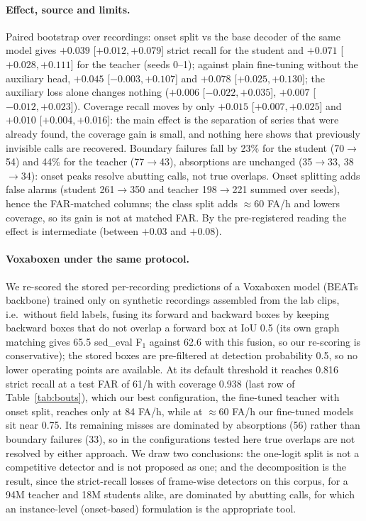 \documentclass[10pt,twocolumn]{article}
\newcommand{\Fone}{F$_1$}
\begin{document}
\paragraph{Effect, source and limits.} Paired bootstrap over recordings: onset split vs the base decoder of the same model gives $+0.039$ [$+0.012,+0.079$] strict recall for the student and $+0.071$ [$+0.028,+0.111$] for the teacher (seeds 0--1); against plain fine-tuning without the auxiliary head, $+0.045$ [$-0.003,+0.107$] and $+0.078$ [$+0.025,+0.130$]; the auxiliary loss alone changes nothing ($+0.006$ [$-0.022,+0.035$], $+0.007$ [$-0.012,+0.023$]). Coverage recall moves by only $+0.015$ [$+0.007,+0.025$] and $+0.010$ [$+0.004,+0.016$]: the main effect is the separation of series that were already found, the coverage gain is small, and nothing here shows that previously invisible calls are recovered. Boundary failures fall by 23\% for the student (70$\to$54) and 44\% for the teacher (77$\to$43), absorptions are unchanged (35$\to$33, 38$\to$34): onset peaks resolve abutting calls, not true overlaps. Onset splitting adds false alarms (student 261$\to$350 and teacher 198$\to$221 summed over seeds), hence the FAR-matched columns; the class split adds $\approx$60 FA/h and lowers coverage, so its gain is not at matched FAR. By the pre-registered reading the effect is intermediate (between $+0.03$ and $+0.08$).

\paragraph{Voxaboxen under the same protocol.} We re-scored the stored per-recording predictions of a Voxaboxen model (BEATs backbone) trained only on synthetic recordings assembled from the lab clips, i.e.\ without field labels, fusing its forward and backward boxes by keeping backward boxes that do not overlap a forward box at IoU 0.5 (its own graph matching gives 65.5 sed\_eval \Fone{} against 62.6 with this fusion, so our re-scoring is conservative); the stored boxes are pre-filtered at detection probability 0.5, so no lower operating points are available. At its default threshold it reaches 0.816 strict recall at a test FAR of 61/h with coverage 0.938 (last row of Table~\ref{tab:bouts}), which our best configuration, the fine-tuned teacher with onset split, reaches only at 84 FA/h, while at $\approx$60 FA/h our fine-tuned models sit near 0.75. Its remaining misses are dominated by absorptions (56) rather than boundary failures (33), so in the configurations tested here true overlaps are not resolved by either approach. We draw two conclusions: the one-logit split is not a competitive detector and is not proposed as one; and the decomposition is the result, since the strict-recall losses of frame-wise detectors on this corpus, for a 94M teacher and 18M students alike, are dominated by abutting calls, for which an instance-level (onset-based) formulation is the appropriate tool.
\end{document}
